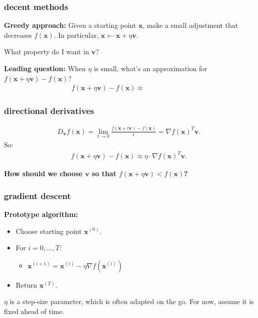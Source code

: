 \documentclass[compress]{beamer}
\newcommand{\bv}[1]{\mathbf{#1}}
\begin{document}
\begin{frame}
	\frametitle{decent methods}
	\textbf{Greedy approach:} Given a starting point $\bv{x}$, make a small adjustment that decreases $f(\bv{x})$. In particular, $\bv{x} \leftarrow \bv{x} + \eta\bv{v}$.
	
	\begin{center}
		\alert{What property do I want in $\bv{v}$?}
	\end{center}
	
	
	\textbf{Leading question:} When $\eta$ is small, what's an approximation for $f(\bv{x} + \eta\bv{v}) - f(\bv{x})$?
	\begin{align*}
		f(\bv{x} + \eta\bv{v}) - f(\bv{x}) \approx \hspace{6em}
	\end{align*}
	
	
\end{frame}

\begin{frame}[t]
	\frametitle{directional derivatives}
	
	\begin{align*}
		D_\bv{v}f(\bv{x}) = \lim_{t\rightarrow 0} \frac{f(\bv{x} + t\bv{v}) - f(\bv{x})}{t} = \nabla f(\bv{x})^T \bv{v}.
	\end{align*}	
	So:
	\begin{align*}
		f(\bv{x} + \eta\bv{v}) - f(\bv{x}) \approx \eta \cdot \nabla f(\bv{x})^T \bv{v}.
	\end{align*}
	
	\textbf{How should we choose $\bv{v}$ so that $f(\bv{x} + \eta\bv{v}) < f(\bv{x})$?} 
	
\end{frame}

\begin{frame}
	\frametitle{gradient descent}
	\textbf{Prototype algorithm:}
	\begin{itemize}
		\item Choose starting point $\bv{x}^{(0)}$.
		\item For $i = 0,\ldots, T$:
		\begin{itemize}
			\item $\bv{x}^{(i+1)} = \bv{x}^{(i)} - \eta \nabla f(\bv{x}^{(i)})$
		\end{itemize}
		\item Return $\bv{x}^{(T)}$.
	\end{itemize}
	
	$\eta$ is a step-size parameter, which is often adapted on the go. For now, assume it is fixed ahead of time.
\end{frame}
\end{document}
